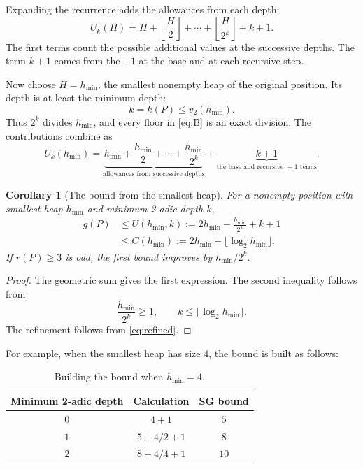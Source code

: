 \documentclass[10pt,a4paper]{article}
\newtheorem{corollary}[theorem]{Corollary}
\begin{document}
Expanding the recurrence adds the allowances from each depth:
\begin{equation}
 U_k(H)=
 H+\left\lfloor\frac H2\right\rfloor
 +\cdots+
 \left\lfloor\frac H{2^k}\right\rfloor
 +k+1.
 \label{eq:B}
\end{equation}
The first terms count the possible additional values at the
successive depths. The term $k+1$ comes from the $+1$ at the
base and at each recursive step.

Now choose $H=h_{\min}$, the smallest nonempty heap of the
original position. Its depth is at least the minimum depth:
\[
 k=k(P)\le v_2(h_{\min}).
\]
Thus $2^k$ divides $h_{\min}$, and every floor in
\eqref{eq:B} is an exact division. The contributions combine as
\[
 U_k(h_{\min})
 =
 \underbrace{
 h_{\min}+\frac{h_{\min}}2+\cdots+
 \frac{h_{\min}}{2^k}
 }_{\text{allowances from successive depths}}
 +
 \underbrace{k+1}_{\text{the base and recursive }+1\text{ terms}}.
\]

\begin{corollary}[The bound from the smallest heap]
\label{cor:closed}
For a nonempty position with smallest heap $h_{\min}$ and
minimum 2-adic depth $k$,
\begin{equation}
 \boxed{
 \begin{aligned}
 g(P)
 &\le U(h_{\min},k)
 :=2h_{\min}-\frac{h_{\min}}{2^k}+k+1 \\
 &\le C(h_{\min})
 :=2h_{\min}+\lfloor\log_2h_{\min}\rfloor.
 \end{aligned}
 }
 \label{eq:closed}
\end{equation}
If $r(P)\ge3$ is odd, the first bound improves by
$h_{\min}/2^k$.
\end{corollary}

\begin{proof}
The geometric sum gives the first expression.
The second inequality follows from
\[
 \frac{h_{\min}}{2^k}\ge1,
 \qquad
 k\le\lfloor\log_2h_{\min}\rfloor.
\]
The refinement follows from \eqref{eq:refined}.
\end{proof}

For example, when the smallest heap has size $4$, the bound
is built as follows:

\begin{table}[H]
\centering
\small
\begin{tabular}{@{}c c c@{}}
\toprule
Minimum 2-adic depth & Calculation & SG bound \\
\midrule
$0$ & $4+1$ & $5$ \\
$1$ & $5+4/2+1$ & $8$ \\
$2$ & $8+4/4+1$ & $10$ \\
\bottomrule
\end{tabular}
\caption{Building the bound when $h_{\min}=4$.}
\label{tab:examplebound}
\end{table}
\end{document}
